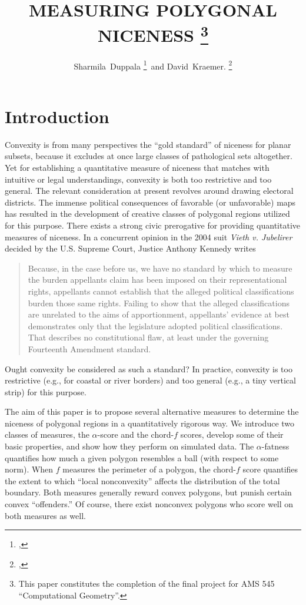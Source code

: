 \documentclass[]{jocg}
\title{%
  \MakeUppercase{Measuring polygonal niceness}%
  \thanks{%
    This paper constitutes the completion of the final project for AMS 545
    ``Computational Geometry''.
  }
}
\author{%
  Sharmila~Duppala%
  \thanks{%
    \affil{Department of Computer Science}, 
    \email{sduppala@cs.stonybrook.edu}%
  }\, and
  David~Kraemer.%
  \thanks{%
    \affil{Department of Applied Mathematics},
    \email{david.kraemer@stonybrook.edu}%
  }
}
\theoremstyle{definition}
\theoremstyle{remark}
\begin{document}
\maketitle

\begin{abstract}
\end{abstract}

\tableofcontents

\section{Introduction}

Convexity is from many perspectives the ``gold standard'' of niceness for planar
subsets, because it excludes at once large classes of pathological sets
altogether. Yet for establishing a quantitative measure of niceness that matches
with intuitive or legal understandings, convexity is both too restrictive and too
general. The relevant consideration at present revolves around drawing electoral
districts. The immense political consequences of favorable (or unfavorable)
maps has resulted in the development of creative classes of polygonal regions
utilized for this purpose. There exists a strong civic prerogative for providing
quantitative measures of niceness. In a concurrent opinion in the 2004 suit
\textit{Vieth v. Jubelirer} decided by the U.S. Supreme Court, Justice Anthony
Kennedy writes 
\begin{quote}
  Because, in the case before us, we have no standard by which to measure the
  burden appellants claim has been imposed on their representational rights,
  appellants cannot establish that the alleged political classifications burden
  those same rights.  Failing to show that the alleged classifications are
  unrelated to the aims of apportionment, appellants’ evidence at best
  demonstrates only that the legislature adopted political classifications. That
  describes no constitutional flaw, at least under the governing Fourteenth
  Amendment standard. \cite{2004vieth}
\end{quote}
Ought convexity be considered as such a standard? In practice, convexity is too
restrictive (e.g., for coastal or river borders) and too general (e.g., a tiny
vertical strip) for this purpose.

The aim of this paper is to propose several alternative measures to determine
the niceness of polygonal regions in a quantitatively rigorous way. We introduce
two classes of measures, the $\alpha$-score and the chord-$f$ scores, develop
some of their basic properties, and show how they perform on simulated data. The
$\alpha$-fatness quantifies how much a given polygon resembles a ball (with
respect to some norm). When $f$ measures the perimeter of a polygon, the
chord-$f$ score quantifies the extent to which ``local nonconvexity'' affects
the distribution of the total boundary. Both measures generally reward convex
polygons, but punish certain convex ``offenders.'' Of course, there exist
nonconvex polygons who score well on both measures as well.
\end{document}

